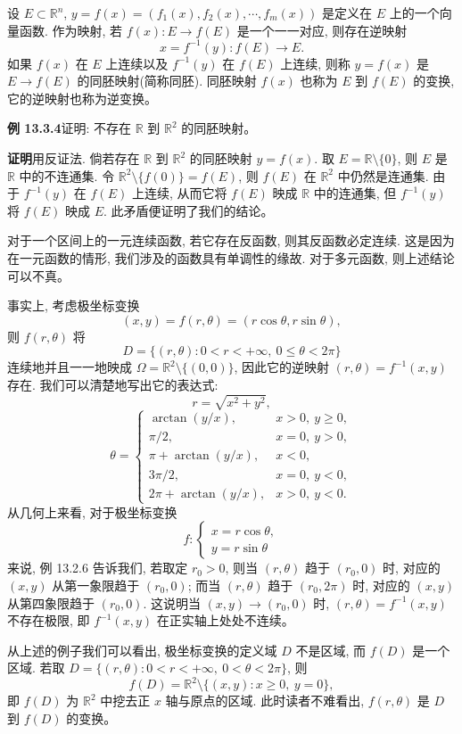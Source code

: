 \documentclass[UTF8, 12pt, fontset=fandol, oneside]{ctexart}
\begin{document}
设 $E\subset\mathbb R^n$, $y=f(x)=(f_1(x),f_2(x),\cdots,f_m(x))$ 是定义在 $E$ 上的一个向量函数. 作为映射, 若 $f(x):E\to f(E)$ 是一个一一对应, 则存在逆映射
\[
  x=f^{-1}(y):f(E)\to E.
\]
如果 $f(x)$ 在 $E$ 上连续以及 $f^{-1}(y)$ 在 $f(E)$ 上连续, 则称 $y=f(x)$ 是 $E\to f(E)$ 的同胚映射(简称同胚). 同胚映射 $f(x)$ 也称为 $E$ 到 $f(E)$ 的变换, 它的逆映射也称为逆变换。

\noindent\textbf{例 13.3.4}\quad 证明: 不存在 $\mathbb R$ 到 $\mathbb R^2$ 的同胚映射。

\noindent\textbf{证明}\quad 用反证法. 倘若存在 $\mathbb R$ 到 $\mathbb R^2$ 的同胚映射 $y=f(x)$. 取 $E=\mathbb R\setminus\{0\}$, 则 $E$ 是 $\mathbb R$ 中的不连通集. 令 $\mathbb R^2\setminus\{f(0)\}=f(E)$, 则 $f(E)$ 在 $\mathbb R^2$ 中仍然是连通集. 由于 $f^{-1}(y)$ 在 $f(E)$ 上连续, 从而它将 $f(E)$ 映成 $\mathbb R$ 中的连通集, 但 $f^{-1}(y)$ 将 $f(E)$ 映成 $E$. 此矛盾便证明了我们的结论。

对于一个区间上的一元连续函数, 若它存在反函数, 则其反函数必定连续. 这是因为在一元函数的情形, 我们涉及的函数具有单调性的缘故. 对于多元函数, 则上述结论可以不真。

事实上, 考虑极坐标变换
\[
  (x,y)=f(r,\theta)=(r\cos\theta,r\sin\theta),
\]
则 $f(r,\theta)$ 将
\[
  D=\{(r,\theta):0<r<+\infty,\ 0\le\theta<2\pi\}
\]
连续地并且一一地映成 $\Omega=\mathbb R^2\setminus\{(0,0)\}$, 因此它的逆映射 $(r,\theta)=f^{-1}(x,y)$ 存在. 我们可以清楚地写出它的表达式:
\[
  r=\sqrt{x^2+y^2},
\]
\[
  \theta=
  \begin{cases}
    \arctan(y/x), & x>0,\ y\ge0,\\
    \pi/2, & x=0,\ y>0,\\
    \pi+\arctan(y/x), & x<0,\\
    3\pi/2, & x=0,\ y<0,\\
    2\pi+\arctan(y/x), & x>0,\ y<0.
  \end{cases}
\]
从几何上来看, 对于极坐标变换
\[
  f:
  \begin{cases}
    x=r\cos\theta,\\
    y=r\sin\theta
  \end{cases}
\]
来说, 例 13.2.6 告诉我们, 若取定 $r_0>0$, 则当 $(r,\theta)$ 趋于 $(r_0,0)$ 时, 对应的 $(x,y)$ 从第一象限趋于 $(r_0,0)$; 而当 $(r,\theta)$ 趋于 $(r_0,2\pi)$ 时, 对应的 $(x,y)$ 从第四象限趋于 $(r_0,0)$. 这说明当 $(x,y)\to(r_0,0)$ 时, $(r,\theta)=f^{-1}(x,y)$ 不存在极限, 即 $f^{-1}(x,y)$ 在正实轴上处处不连续。

从上述的例子我们可以看出, 极坐标变换的定义域 $D$ 不是区域, 而 $f(D)$ 是一个区域. 若取 $D=\{(r,\theta):0<r<+\infty,\ 0<\theta<2\pi\}$, 则
\[
  f(D)=\mathbb R^2\setminus\{(x,y):x\ge0,\ y=0\},
\]
即 $f(D)$ 为 $\mathbb R^2$ 中挖去正 $x$ 轴与原点的区域. 此时读者不难看出, $f(r,\theta)$ 是 $D$ 到 $f(D)$ 的变换。
\end{document}
